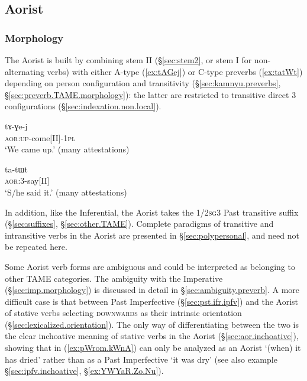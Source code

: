 \subsection{Aorist}    \label{sec:aor}

\subsubsection{Morphology} \label{sec:aor.morphology}
The Aorist is built by combining stem II (§\ref{sec:stem2}, or stem I for non-alternating verbs) with either A-type (\ref{ex:tAGej}) or C-type preverbs (\ref{ex:tatWt}) depending on person configuration and transitivity (§\ref{sec:kamnyu.preverbs}, §\ref{sec:preverb.TAME.morphology}): the latter are restricted to transitive direct 3\flobv{} configurations (§\ref{sec:indexation.non.local}).

\begin{exe}
\ex \label{ex:tAGej}
 \gll tɤ-ɣe-j \\
\textsc{aor}:\textsc{up}-come[II]-\textsc{1pl} \\
\glt `We came up.' (many attestations)
\end{exe}

\begin{exe}
\ex \label{ex:tatWt}
 \gll ta-tɯt \\
\textsc{aor}:3\flobv{}-say[II]  \\
\glt `S/he said it.' (many attestations)
\end{exe}

In addition, like the Inferential, the Aorist takes the 1/2\textsc{sg}\fl{}3 Past transitive suffix  (§\ref{sec:suffixes}, §\ref{sec:other.TAME}). Complete paradigms of transitive and intransitive verbs in the Aorist are presented in §\ref{sec:polypersonal}, and need not be repeated here.

Some Aorist verb forms are ambiguous and could be interpreted as belonging to other TAME categories. The ambiguity with the Imperative (§\ref{sec:imp.morphology}) is discussed in detail in §\ref{sec:ambiguity.preverb}. A more difficult case is that between Past Imperfective  (§\ref{sec:pst.ifr.ipfv}) and the Aorist of stative verbs selecting \textsc{downwards} as their intrinsic orientation (§\ref{sec:lexicalized.orientation}). The only way of differentiating between the two is the clear inchoative meaning of stative verbs in the Aorist (§\ref{sec:aor.inchoative}), showing that  in (\ref{ex:pWrom.kWnA}) can only be analyzed as an Aorist `(when) it has dried' rather than as a Past Imperfective `it was dry' (see also example §\ref{sec:ipfv.inchoative},  §\ref{ex:YWYaR.Zo.Nu}).

